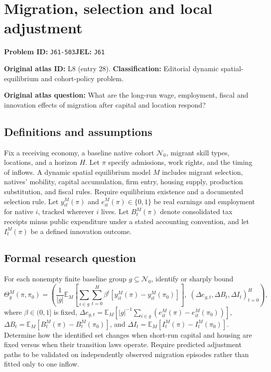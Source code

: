 \documentclass[11pt,a4paper]{article}
\begin{document}
\section*{Migration, selection and local adjustment}
\textbf{Problem ID:} \texttt{J61-503}\quad \textbf{JEL:} \texttt{J61}\par
\label{problem:OP-0028}
\label{atlas:prob:L8}
\noindent\textbf{Original atlas ID:} L8 (entry 28). \textbf{Classification:} Editorial dynamic spatial-equilibrium and cohort-policy problem.

\noindent\textbf{Original atlas question:} What are the long-run wage, employment, fiscal and innovation effects of migration after capital and location respond?

\subsection*{Definitions and assumptions}
Fix a receiving economy, a baseline native cohort $\mathcal N_0$, migrant skill types, locations, and a horizon $H$. Let $\pi$ specify admissions, work rights, and the timing of inflows. A dynamic spatial equilibrium model $M$ includes migrant selection, natives' mobility, capital accumulation, firm entry, housing supply, production substitution, and fiscal rules. Require equilibrium existence and a documented selection rule. Let $y_{it}^M(\pi)$ and $e_{it}^M(\pi)\in\{0,1\}$ be real earnings and employment for native $i$, tracked wherever $i$ lives. Let $B_t^M(\pi)$ denote consolidated tax receipts minus public expenditure under a stated accounting convention, and let $I_t^M(\pi)$ be a defined innovation outcome.
\subsection*{Formal research question}
For each nonempty finite baseline group $g\subseteq\mathcal N_0$, identify or sharply bound
\[
 \Theta_g^M(\pi,\pi_0)=\left(
 \frac1{|g|}\mathbb E_M\left[\sum_{i\in g}\sum_{t=0}^H\beta^t
      [y_{it}^M(\pi)-y_{it}^M(\pi_0)]\right],\;
 (\Delta e_{g,t},\Delta B_t,\Delta I_t)_{t=0}^H\right),
\]
where $\beta\in(0,1]$ is fixed, $\Delta e_{g,t}=\mathbb E_M[|g|^{-1}\sum_{i\in g}(e_{it}^M(\pi)-e_{it}^M(\pi_0))]$, $\Delta B_t=\mathbb E_M[B_t^M(\pi)-B_t^M(\pi_0)]$, and $\Delta I_t=\mathbb E_M[I_t^M(\pi)-I_t^M(\pi_0)]$. Determine how the identified set changes when short-run capital and housing are fixed versus when their transition laws operate. Require predicted adjustment paths to be validated on independently observed migration episodes rather than fitted only to one inflow.
\end{document}
